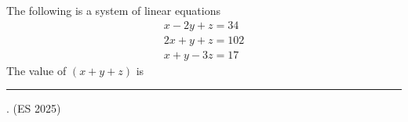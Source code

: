 \item The following is a system of linear equations
\begin{align*}
x - 2y + z = 34 \\
2x + y + z = 102 \\
x + y - 3z = 17 
\end{align*}
The value of $(x + y + z)$ is \rule{1cm}{0.01pt}.  \hfill (ES 2025)
